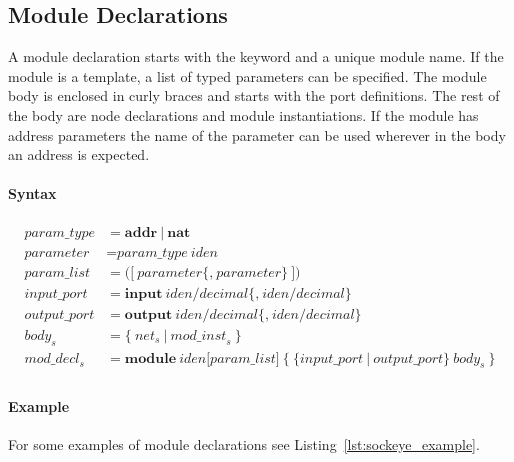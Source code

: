 \documentclass[a4paper,11pt,twoside]{report}
\begin{document}
{{{\subsection{Module Declarations}
A module declaration starts with the keyword  and a unique module name.
If the module is a template, a list of typed parameters can be specified.
The module body is enclosed in curly braces and starts with the port definitions.
The rest of the body are node declarations and module instantiations.
If the module has address parameters the name of the parameter can be used wherever in the body an address is expected.

\paragraph{Syntax}
\begin{align*}
    \textit{param\_type} & \mathop{=}
        \textbf{addr}\ |\ \textbf{nat}\\
    \textit{parameter} & \mathop{=}
        \textit{param\_type}\ \textit{iden}\\
    \textit{param\_list} & \mathop{=}
        \textbf{(}\big[\ 
            \textit{parameter}\big\{\textbf{,}\ \textit{parameter}\big\}\ 
        \big] \textbf{)}\\
    \textit{input\_port} & \mathop{=}
        \textbf{input}\ \textit{iden}\textbf{/}\textit{decimal}
        \big\{
            \textbf{,}\ \textit{iden}\textbf{/}\textit{decimal}
        \big\}\\
    \textit{output\_port} & \mathop{=}
        \textbf{output}\ \textit{iden}\textbf{/}\textit{decimal}
        \big\{
            \textbf{,}\ \textit{iden}\textbf{/}\textit{decimal}
        \big\}\\
    \textit{body}_s & \mathop{=}
        \big\{\ 
            \textit{net}_s\ |\ \textit{mod\_inst}_s\ 
        \big\}\\
    \textit{mod\_decl}_s & \mathop{=}
        \textbf{module}\ \textit{iden} \big[\textit{param\_list}\big]\ 
        \textbf{\{}\ 
            \big\{\textit{input\_port}\ |\ \textit{output\_port}\big\}\ 
            \textit{body}_s\ 
        \textbf{\}}\\
\end{align*}

\paragraph{Example}
For some examples of module declarations see Listing~\ref{lst:sockeye_example}.

}}}
\end{document}
